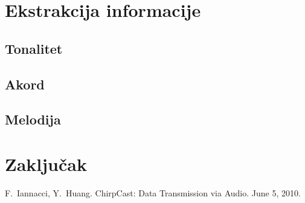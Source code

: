 \documentclass[a4paper, 11pt, twocolumn]{article}
\begin{document}
\section{Ekstrakcija informacije}

\subsection{Tonalitet}

\subsection{Akord}

\subsection{Melodija}

\section{Zaključak}

\begin{thebibliography}{25}
F.~Iannacci, Y.~Huang.
ChirpCast: Data Transmission via Audio.
June 5, 2010.

\end{thebibliography} 
\end{document}
